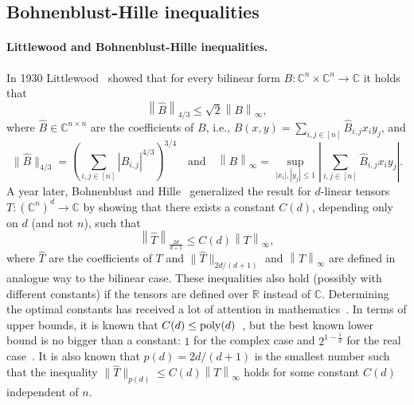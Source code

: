 \documentclass[11pt]{article}
\newcommand{\norm}[1]{\left\|{#1}\right\|}
\theoremstyle{plain}
\newcommand{\poly}{\mbox{\rm poly}}
\theoremstyle{plain}
\theoremstyle{definition}
\theoremstyle{remark}
\theoremstyle{named}
\begin{document}
\subsection{Bohnenblust-Hille  inequalities}\label{subsec:introBH} 
\paragraph{Littlewood and Bohnenblust-Hille inequalities.} In 1930 Littlewood~\cite{littlewood1930bounded} showed that for every bilinear form $B:\mathbb C^n\times\mathbb C^n \to \mathbb C$ it holds that 
\begin{equation}\label{eq:littlewood}
    \norm{\widehat B}_{4/3}\leq \sqrt{2}\norm{B}_{\infty},
\end{equation}
where $\widehat B\in \mathbb C^{n\times n}$ are the coefficients of $B$, i.e., $B(x,y)=\sum_{i,j\in [n]}\widehat B_{i,j}x_iy_j$,  and
$$
\|\widehat B \|_{4/3}=\left(\sum_{i,j\in [n]}|\widehat B_{i,j}|^{4/3}\right)^{3/4}\quad \mathrm{and}\quad \norm{B}_\infty=\sup_{|x_i|,
|y_j|\leq 1}\left|\sum_{i,j\in [n]}\widehat B_{i,j} x_iy_j\right|.
$$  
A year later, Bohnenblust and Hille~\cite{bohnenblust1931absolute} generalized the result for $d$-linear tensors $T:(\mathbb C^n)^d\to \mathbb C$ by showing that  there exists a constant $C(d)$,  depending only on $d$ (and not $n$), such that 
\begin{equation}\label{eq:BH}
    \norm{\widehat T}_{\frac{2d}{d+1}}\leq C(d)\norm{T}_{\infty},
\end{equation}
where $\widehat T$ are the coefficients of $T$ and $\|\widehat T\|_{2d/(d+1)}$ and $\norm T_\infty$ are defined in analogue way to the bilinear case.
 These inequalities also hold (possibly with different constants) if the tensors are defined over $\mathbb R$ instead of $\mathbb C$. Determining the optimal constants has received a lot of attention in mathematics~\cite{pellegrino2012new,munoz2012geometric,nunez2013there,pellegrino2018towards,vieira2018optimal,cavalcante2020geometry}.    In terms of upper bounds, it is known that $C(d)
\leq \poly (d)$~\cite{bayart2014bohr}, but the best known lower bound is no bigger than a constant: $1$ for the complex case and $2^{1-\frac{1}{d}}$ for the real case~\cite{diniz2014lower}. It is also known that $p(d)=2d/(d+1)$ is the smallest number such that the inequality $\|\widehat T\|_{p(d)}\leq  C(d)\norm{T}_{\infty}$ holds for some constant $C(d)$ independent of $n$. 
\end{document}
